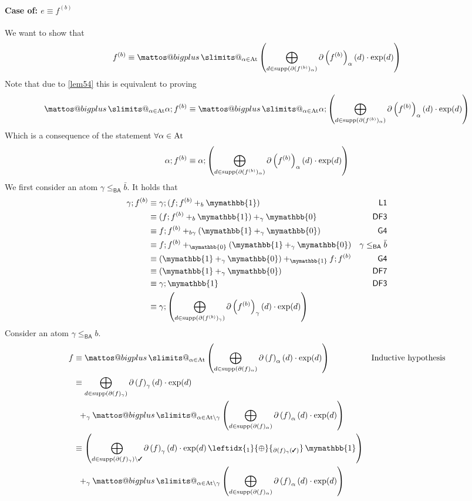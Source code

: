 \documentclass[a4paper,UKenglish,cleveref, autoref, thm-restate]{lipics-v2021}
\makeatletter
\newcommand{\cmark}{\text{\ding{51}}}
\newcommand{\At}{\text{\upshape{At}}}
\newcommand{\BA}{\textsf{BA}}
\newcommand{\ex}{\text{\upshape{exp}}}
\newcommand{\WC}[2]{\,\leftidx{_{#1}}{{\oplus}}{_{#2}}\,}
\newcommand{\Ax}[1]{\ensuremath{\mathsf{#1}}}
\newcommand{\bskip}{\mymathbb{1}}
\newcommand{\babort}{\mymathbb{0}}
\theoremstyle{plain}\newtheoremrep{thm}{Theorem}[section]
\newcommand{\bigplus}{\DOTSB\mathop{\mathpalette\mattos@bigplus\relax}\slimits@
}
\newcommand\mattos@bigplus[2]{\vcenter{\hbox{\sbox\z@{$#1\sum$}\resizebox{!}{0.9\dimexpr\ht\z@+\dp\z@}{\raisebox{\depth}{$\m@th#1+$}}}}\vphantom{\sum}}
\makeatother
\begin{document}
\begin{appendixproof}
	\paragraph*{Case of: $e \equiv f^{(b)}$}
	We want to show that $$f^{(b)} \equiv \bigplus_{\alpha \in \At}\left(\bigoplus_{d \in \text{supp}(\partial(f^{(b)})_\alpha)}\partial\left(f^{(b)}\right)_\alpha(d)\cdot\ex(d)\right)$$
	Note that due to \cref{lem54} this is equivalent to proving $$\bigplus_{\alpha \in \At} \alpha;f^{(b)} \equiv \bigplus_{\alpha \in \At}\alpha;\left(\bigoplus_{d \in \text{supp}(\partial(f^{(b)})_\alpha)}\partial\left(f^{(b)}\right)_\alpha(d)\cdot\ex(d)\right)$$
	Which is a consequence of the statement $\forall \alpha \in \At$
	$$\alpha;f^{(b)} \equiv \alpha;\left(\bigoplus_{d \in \text{supp}(\partial(f^{(b)})_\alpha)}\partial\left(f^{(b)}\right)_\alpha(d)\cdot\ex(d)\right)$$
	We first consider an atom $\gamma \leq_{\BA} \bar b$. It holds that
	\begin{align*}
		\gamma;f^{(b)} &\equiv \gamma;(f;f^{(b)}+_b \bskip)&\Ax{L1}\\
		&\equiv (f;f^{(b)}+_b \bskip)+_\gamma \babort&\Ax{DF3}\\
		&\equiv f;f^{(b)}+_{b\gamma}(\bskip +_\gamma \babort)&\Ax{G4}\\
		&\equiv f;f^{(b)}+_{\babort}(\bskip +_\gamma \babort)&\gamma \leq_{\BA} \bar b\\
		&\equiv (\bskip+_\gamma \babort)+_{\bskip} f;f^{(b)}&\Ax{G4}\\
		&\equiv (\bskip+_\gamma \babort)&\Ax{DF7}\\
		&\equiv \gamma;\bskip&\Ax{DF3}\\
		&\equiv \gamma;\left(\bigoplus_{d \in \text{supp}(\partial(f^{(b)})_\gamma)}\partial\left(f^{(b)}\right)_\gamma(d)\cdot\ex(d)\right)&
	\end{align*}
	Consider an atom $\gamma \leq_{\BA} b$.
	\begin{align*}
		f &\equiv \bigplus_{\alpha \in \At}\left(\bigoplus_{d \in \text{supp}(\partial(f)_\alpha)}\partial\left(f\right)_\alpha(d)\cdot\ex(d)\right) & \text{Inductive hypothesis}\\
		&\equiv \bigoplus_{d \in \text{supp}(\partial(f)_\gamma)}\partial\left(f\right)_\gamma(d)\cdot\ex(d) \\&\;\;+_\gamma \bigplus_{\alpha \in \At\setminus \gamma}\left(\bigoplus_{d \in \text{supp}(\partial(f)_\alpha)}\partial\left(f\right)_\alpha(d)\cdot\ex(d)\right)\\
		&\equiv \left(\bigoplus_{d \in \text{supp}(\partial(f)_\gamma) \setminus \cmark}\partial\left(f\right)_\gamma(d)\cdot\ex(d) \WC{1}{\partial(f)_\gamma(\cmark)} \bskip\right) \\&\;\;+_\gamma \bigplus_{\alpha \in \At\setminus \gamma}\left(\bigoplus_{d \in \text{supp}(\partial(f)_\alpha)}\partial\left(f\right)_\alpha(d)\cdot\ex(d)\right)

\end{align*}
\end{appendixproof}
\end{document}
